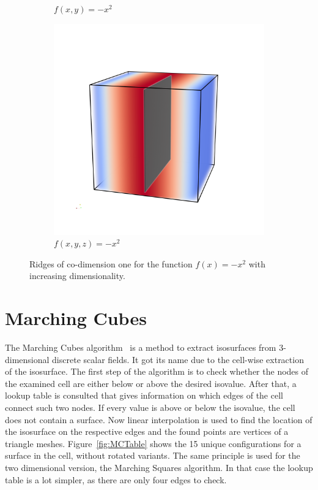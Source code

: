 \begin{figure}
\begin{subfigure}[b]{0.33\textwidth}
    \caption{$f(x,y)= -x^2$}
    \label{fig:ridge2D}
  \end{subfigure}
  \begin{subfigure}[b]{0.33\textwidth}
    \includegraphics[width=\textwidth]{Images/func3D.png}
    \caption{$f(x,y,z)= -x^2$}
    \label{fig:ridge3D}
  \end{subfigure}
  \caption{Ridges of co-dimension one for the function $f(x)=-x^2$ with
  increasing dimensionality.}
\end{figure}

\section{Marching Cubes}

The Marching Cubes algorithm~\cite{MC} is a method to extract
isosurfaces from 3-dimensional discrete scalar fields. It got its name
due to the cell-wise extraction of the isosurface. The first step of the
algorithm is to check whether the nodes of the examined cell are either
below or above the desired isovalue. After that, a lookup table is
consulted that gives information on which edges of the cell connect such
two nodes. If every value is above or below the isovalue, the cell does
not contain a surface. Now linear interpolation is used to find the
location of the isosurface on the respective edges and the found points
are vertices of a triangle meshes. Figure~\ref{fig:MCTable} shows the
15 unique configurations for a surface in the cell, without
rotated variants. The same principle is used for the two dimensional
version, the Marching Squares algorithm. In that case the lookup table
is a lot simpler, as there are only four edges to check.


